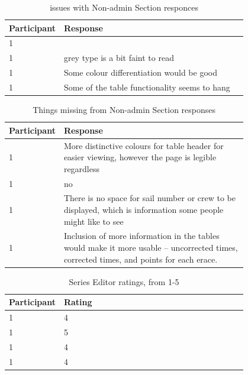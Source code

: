 \documentclass{l4proj}
\begin{document}
\begin{appendices}
\begin{table}[!ht]
    \centering
    \caption{issues with Non-admin Section responces}
    \begin{tabular}{|l|p{0.8\linewidth}|}
    \hline
        \textbf{Participant} & \textbf{Response}  \\ \hline
        1 &   \\ \hline
        1 & grey type is a bit faint to read  \\ \hline
        1 & Some colour differentiation would be good  \\ \hline
        1 & Some of the table functionality seems to hang  \\ \hline
    \end{tabular}
\end{table}
\begin{table}[!ht]
    \centering
    \caption{Things missing from Non-admin Section responses}
    \begin{tabular}{|l|p{0.8\linewidth}|}
    \hline
        \textbf{Participant} & \textbf{Response}  \\ \hline
        1 & More distinctive colours for table header for easier viewing, however the page is legible regardless  \\ \hline
        1 & no  \\ \hline
        1 & There is no space for sail number or crew to be displayed, which is information some people might like to see  \\ \hline
        1 & Inclusion of more information in the tables would make it more usable -- uncorrected times, corrected times, and points for each erace.  \\ \hline
    \end{tabular}
\end{table}
\begin{table}[!ht]
    \centering
    \caption{Series Editor ratings, from 1-5}
    \begin{tabular}{|l|p{0.8\linewidth}|}
    \hline
        \textbf{Participant} & \textbf{Rating}  \\ \hline
        1 & 4  \\ \hline
        1 & 5  \\ \hline
        1 & 4  \\ \hline
        1 & 4  \\ \hline
    \end{tabular}
\end{table}
\begin{table}[!ht]
    \centering

\end{table}
\end{appendices}
\end{document}

